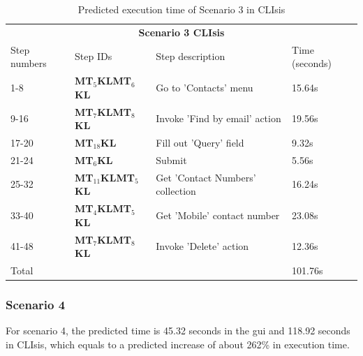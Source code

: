 \begin{table}[H]
	\center
	
	\begin{tabular}{llll}
		\toprule
		\multicolumn{4}{c}{\textbf{Scenario 3 CLIsis}} \\
		\addlinespace[0.5em]
		Step numbers & Step IDs & Step description & Time (seconds) \\
		\midrule
		1-8 		& \textbf{MT$_5$KLMT$_6$KL}		& Go to 'Contacts' menu 					& 15.64s \\
		9-16		& \textbf{MT$_7$KLMT$_8$KL}		& Invoke 'Find by email' action			& 19.56s \\
		17-20	& \textbf{MT$_{18}$KL}					& Fill out 'Query' field						& 9.32s \\
		21-24	& \textbf{MT$_6$KL}							& Submit											& 5.56s \\
		25-32	& \textbf{MT$_{11}$KLMT$_5$KL}	& Get 'Contact Numbers' collection	& 16.24s \\
		33-40	& \textbf{MT$_4$KLMT$_5$KL}		& Get 'Mobile' contact number			& 23.08s \\
		41-48	& \textbf{MT$_{7}$KLMT$_8$KL}		& Invoke 'Delete' action					& 12.36s \\
		\midrule
		\multicolumn{3}{l}{Total}																						& 101.76s\\
		\bottomrule
	\end{tabular}
	
	\caption{Predicted execution time of Scenario 3 in CLIsis}
	\label{table:gomsscenario3clisis}
\end{table}

\subsubsection{Scenario 4}
For scenario 4, the predicted time is 45.32 seconds in the \acrshort{gui} and 118.92 seconds in CLIsis, which equals to a predicted increase of about 262\% in execution time.

